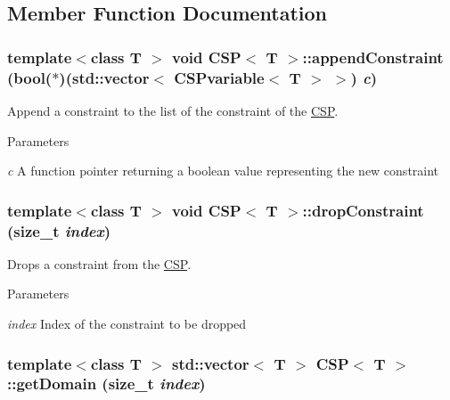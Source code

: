 \subsection{Member Function Documentation}
\hypertarget{classCSP_a8dc6aec6ca7e40d198e58b0ec14fee66}{
\subsubsection[{appendConstraint}]{\setlength{\rightskip}{0pt plus 5cm}template$<$class T $>$ void {\bf CSP}$<$ T $>$::appendConstraint (bool($\ast$)(std::vector$<$ {\bf CSPvariable}$<$ T $>$ $>$) {\em c})}}
\label{classCSP_a8dc6aec6ca7e40d198e58b0ec14fee66}


Append a constraint to the list of the constraint of the \hyperlink{classCSP}{CSP}. 


\begin{DoxyParams}{Parameters}
\item[{\em c}]A function pointer returning a boolean value representing the new constraint \end{DoxyParams}
\hypertarget{classCSP_a0231b93bceae257f0e1c35041f8fe63f}{
\subsubsection[{dropConstraint}]{\setlength{\rightskip}{0pt plus 5cm}template$<$class T $>$ void {\bf CSP}$<$ T $>$::dropConstraint (size\_\-t {\em index})}}
\label{classCSP_a0231b93bceae257f0e1c35041f8fe63f}


Drops a constraint from the \hyperlink{classCSP}{CSP}. 


\begin{DoxyParams}{Parameters}
\item[{\em index}]Index of the constraint to be dropped \end{DoxyParams}
\hypertarget{classCSP_a2a9a7d8072613f6984795d5495373847}{
\subsubsection[{getDomain}]{\setlength{\rightskip}{0pt plus 5cm}template$<$class T $>$ std::vector$<$ T $>$ {\bf CSP}$<$ T $>$::getDomain (size\_\-t {\em index})}}
\label{classCSP_a2a9a7d8072613f6984795d5495373847}


